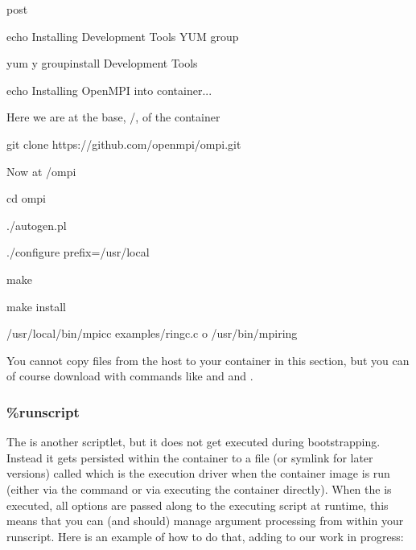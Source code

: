 \documentclass[letterpaper,10pt,english]{sphinxmanual}
\begin{document}
%
\begin{sphinxVerbatim}[commandchars=\\\{\}]
\PYGZpc{}post

    echo \PYGZdq{}Installing Development Tools YUM group\PYGZdq{}

    yum \PYGZhy{}y groupinstall \PYGZdq{}Development Tools\PYGZdq{}

    echo \PYGZdq{}Installing OpenMPI into container...\PYGZdq{}


    \PYGZsh{} Here we are at the base, /, of the container

    git clone https://github.com/open\PYGZhy{}mpi/ompi.git


    \PYGZsh{} Now at /ompi

    cd ompi

    ./autogen.pl

    ./configure \PYGZhy{}\PYGZhy{}prefix=/usr/local

    make

    make install


    /usr/local/bin/mpicc examples/ring\PYGZus{}c.c \PYGZhy{}o /usr/bin/mpi\PYGZus{}ring
\end{sphinxVerbatim}

You cannot copy files from the host to your container in this section,
but you can of course download with commands like  and  and .


\subsubsection{\%runscript}
\label{\detokenize{container_recipes:runscript}}\label{\detokenize{container_recipes:id3}}\label{\detokenize{container_recipes:sec-runscript}}
The  is another scriptlet, but it does not get executed during
bootstrapping. Instead it gets persisted within the container to a
file (or symlink for later versions) called  which is the execution
driver when the container image is run (either via the  command or via
executing the container directly).
When the  is executed, all options are passed along to the executing
script at runtime, this means that you can (and should) manage
argument processing from within your runscript. Here is an example of
how to do that, adding to our work in progress:
\end{document}
